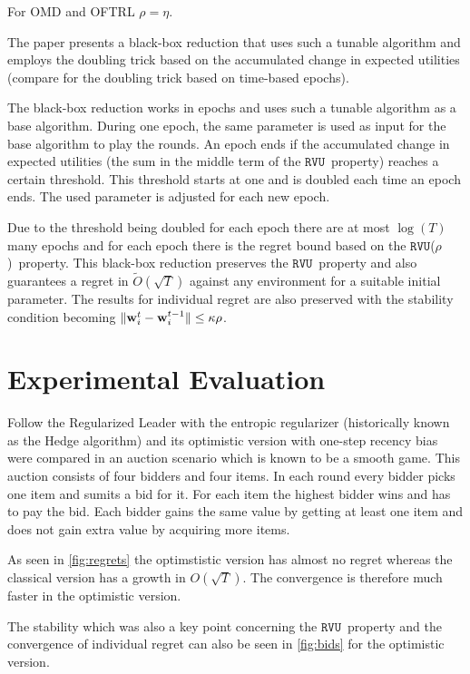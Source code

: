 \documentclass[a4paper]{article}
\theoremstyle{definition}
\newcommand{\myprop}{\ensuremath{\texttt{RVU}}}
\newcommand{\mst}{\ensuremath{w}}
\newcommand{\stable}{\ensuremath{\kappa}}
\newcommand{\knob}{\ensuremath{\rho}}
\renewcommand{\vec}[1]{\ensuremath{{\bf #1}}}
\begin{document}
For OMD and OFTRL $ \knob = \eta$.

The paper presents a black-box reduction that uses such a tunable algorithm and employs
the doubling trick based on the accumulated change in
expected utilities (compare \cite[p.130]{Foundations} for the doubling
trick based on time-based epochs).

The black-box reduction works in epochs and uses such a tunable
algorithm as a base algorithm.
During one epoch, the same parameter is used as input for the base
algorithm to play the rounds.
An epoch ends if the accumulated change in expected utilities (the sum in the
middle term of the \myprop~property) reaches a certain threshold.
This threshold starts at one and is doubled each time an epoch ends.
The used parameter is adjusted for each new epoch.

Due to the threshold being doubled for each epoch there are at most $\log(T)$ many epochs and for
each epoch there is the regret bound based on the
\myprop(\knob)~property.
This black-box reduction preserves the \myprop~property and also
guarantees a regret in
$\tilde{O}(\sqrt{T})$ against any environment for a
suitable initial parameter.
The results for individual regret are also preserved with the stability
condition becoming $\|\vec{\mst}_i^t-\vec{\mst}_i^{t-1}\| \leq \stable\knob$.



\section{Experimental Evaluation}

Follow the Regularized Leader with the entropic regularizer
(historically known as the Hedge algorithm) and its optimistic version
with one-step recency bias were compared in an auction scenario which is
known to be a smooth game.
This auction consists of four bidders and four items.
In each round every bidder picks one item and sumits a bid for it.
For each item the highest bidder wins and has to pay the bid.
Each bidder gains the same value by getting at least one item and does
not gain extra value by acquiring more items.

As seen in \autoref{fig:regrets} the optimstistic version has almost no regret
whereas the classical version has a growth in $O(\sqrt{T})$.
The convergence is therefore much faster in the optimistic version.

The stability which was also a key point concerning the
\myprop~property and the convergence of individual regret can also be
seen in \autoref{fig:bids} for the optimistic version.
\end{document}
